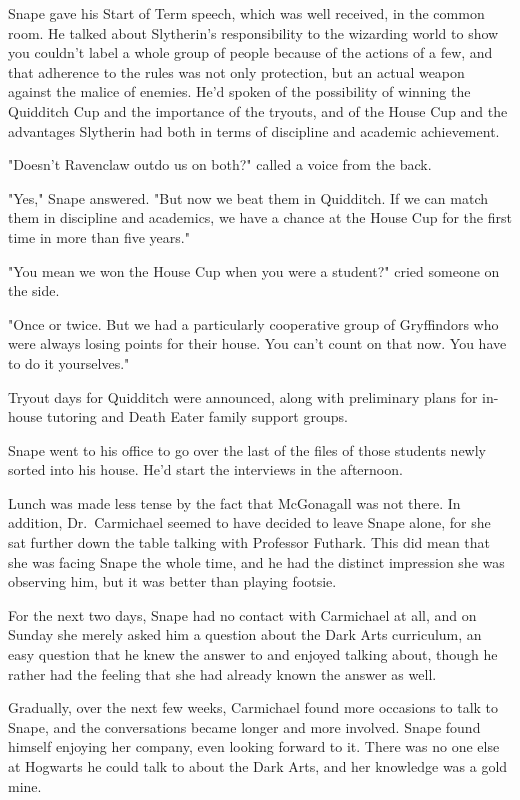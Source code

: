 Snape gave his Start of Term speech, which was well received, in the common room. He talked about Slytherin's responsibility to the wizarding world to show you couldn't label a whole group of people because of the actions of a few, and that adherence to the rules was not only protection, but an actual weapon against the malice of enemies. He'd spoken of the possibility of winning the Quidditch Cup and the importance of the tryouts, and of the House Cup and the advantages Slytherin had both in terms of discipline and academic achievement.

"Doesn't Ravenclaw outdo us on both?" called a voice from the back.

"Yes," Snape answered. "But now we beat them in Quidditch. If we can match them in discipline and academics, we have a chance at the House Cup for the first time in more than five years."

"You mean we won the House Cup when you were a student?" cried someone on the side.

"Once or twice. But we had a particularly cooperative group of Gryffindors who were always losing points for their house. You can't count on that now. You have to do it yourselves."

Tryout days for Quidditch were announced, along with preliminary plans for in-house tutoring and Death Eater family support groups.

Snape went to his office to go over the last of the files of those students newly sorted into his house. He'd start the interviews in the afternoon.

Lunch was made less tense by the fact that McGonagall was not there. In addition, Dr.~Carmichael seemed to have decided to leave Snape alone, for she sat further down the table talking with Professor Futhark. This did mean that she was facing Snape the whole time, and he had the distinct impression she was observing him, but it was better than playing footsie.

For the next two days, Snape had no contact with Carmichael at all, and on Sunday she merely asked him a question about the Dark Arts curriculum, an easy question that he knew the answer to and enjoyed talking about, though he rather had the feeling that she had already known the answer as well.

Gradually, over the next few weeks, Carmichael found more occasions to talk to Snape, and the conversations became longer and more involved. Snape found himself enjoying her company, even looking forward to it. There was no one else at Hogwarts he could talk to about the Dark Arts, and her knowledge was a gold mine.

